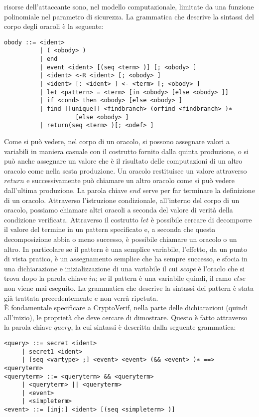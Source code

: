 \documentclass[a4paper,openright,twoside,12pt]{report}
\begin{document}
risorse dell'attaccante sono, nel modello computazionale, limitate da una funzione polinomiale nel parametro di sicurezza.
La grammatica che descrive la sintassi del corpo degli oracoli \`e la seguente:
\begin{verbatim}
obody ::= <ident>
          | ( <obody> )
          | end
          | event <ident> [(seq <term> )] [; <obody> ]
          | <ident> <-R <ident> [; <obody> ]
          | <ident> [: <ident> ] <- <term> [; <obody> ]
          | let <pattern> = <term> [in <obody> [else <obody> ]]
          | if <cond> then <obody> [else <obody> ]
          | find [[unique]] <findbranch> (orfind <findbranch> )∗ 
                    [else <obody> ]
          | return(seq <term> )[; <odef> ]

\end{verbatim}
Come si pu\`o vedere, nel corpo di un oracolo, si possono assegnare valori a variabili in maniera casuale con il costrutto fornito dalla quinta produzione, o si pu\`o anche
assegnare un valore che \`e il risultato delle computazioni di un altro oracolo come nella sesta produzione. Un oracolo restituisce un valore attraverso $return$ e successivamente 
pu\`o chiamare un altro oracolo come si pu\`o vedere dall'ultima produzione. La parola chiave $end$ serve per far terminare la definizione di un oracolo.
Attraverso l'istruzione condizionale, all'interno del corpo di un oracolo, possiamo chiamare altri oracoli a seconda del valore di verit\`a della condizione verificata.
Attraverso il costrutto $let$ \`e possibile cercare di decomporre il valore del termine in un pattern specificato e, a seconda che questa decomposizione abbia o meno successo,
\`e possibile chiamare un oracolo o un altro. In particolare se il pattern \`e una semplice variabile, l'effetto, da un punto di vista pratico, \`e un assegnamento semplice 
che ha sempre successo, e sfocia in una dichiarazione e inizializzazione di una variabile il cui \emph{scope} \`e l'oraclo che si trova dopo la parola chiave $in$; 
se il pattern \`e una variabile quindi, il ramo $else$ non viene mai eseguito. 
La grammatica che descrive la sintassi dei pattern \`e stata gi\`a trattata precedentemente e non verr\`a ripetuta.\\
\`E fondamentale specificare a CryptoVerif, nella parte delle dichiarazioni (quindi all'inizio), 
le propriet\`a che deve cercare di dimostrare. Questo \`e fatto attraverso la parola chiave $query$, la cui sintassi \`e
descritta dalla seguente grammatica:
\begin{verbatim}
<query> ::= secret <ident>
     | secret1 <ident>
     | [seq <vartype> ;] <event> <event> (&& <event> )∗ ==> <queryterm>
<queryterm> ::= <queryterm> && <queryterm>
     | <queryterm> || <queryterm>
     | <event>
     | <simpleterm>
<event> ::= [inj:] <ident> [(seq <simpleterm> )]
\end{verbatim}
\end{document}

